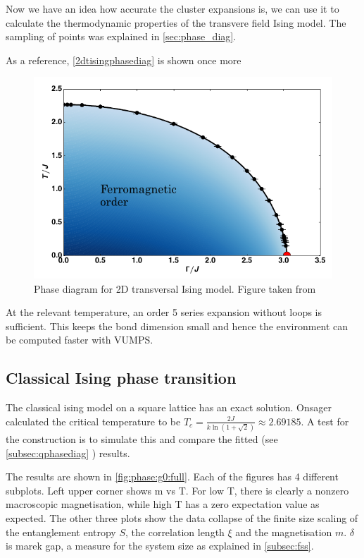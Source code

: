 
Now we have an idea how accurate the cluster expansions is, we can use it to calculate the thermodynamic properties of the transvere field Ising model. The sampling of points was explained in \cref{sec:phase_diag}.

As a reference, \cref{2dtisingphasediag} is shown once more

\begin{figure}[H]
    \center
    \includegraphics[width=\textwidth]{Figuren/phsyics/2disingphase.png}
    \caption{Phase diagram for 2D transversal Ising model. Figure taken from \cite{Hesselmann2016}}
    \label{2dtisingphasediag2}
\end{figure}

At the relevant temperature, an order 5 series expansion without loops is sufficient. This keeps the bond dimension small and hence the environment can be computed faster with VUMPS.

\subsection{Classical Ising phase transition}
The classical ising model on a square lattice has an exact solution. Onsager calculated the critical temperature to be $T_c = \frac{2 J}{k \ln(1+\sqrt{2}) } \approx 2.69185$. A test for the construction is to simulate this and compare the fitted (see \cref{subsec:qphasediag} ) results.

The results are shown in \cref{fig:phase:g0:full}. Each of the figures has 4 different subplots. Left upper corner shows m vs T. For low T, there is clearly a nonzero macroscopic magnetisation, while high T has a zero expectation value as expected. The other three plots show the data collapse of the finite size scaling of the entanglement entropy $S$, the correlation length $\xi$ and the magnetisation $m$. $\delta$ is marek gap, a measure for the system size as explained in \cref{subsec:fss}.

